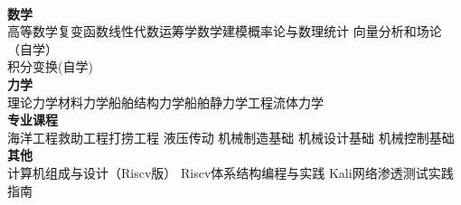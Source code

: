 \documentclass{ctexart}
\begin{document}
\begin{flushleft}
    {\linespread{1.5}\selectfont
    \hrulefill \\
    \textbf{\large 数学} \\
    高等数学\quad 复变函数\quad 线性代数\quad 运筹学\quad 数学建模\quad 概率论与数理统计 \quad 向量分析和场论（自学） \\
    积分变换(自学) \\

    \textbf{\large 力学} \\
    理论力学\quad 材料力学\quad 船舶结构力学\quad 船舶静力学\quad 工程流体力学 \\

    \textbf{\large 专业课程}  \\
    海洋工程\quad 救助工程\quad 打捞工程 \quad 液压传动 \quad 机械制造基础 \quad 机械设计基础 
    \quad 机械控制基础 \\
    \textbf{\large 其他} \\
    计算机组成与设计（Riscv版） \quad Riscv体系结构编程与实践 \quad Kali网络渗透测试实践指南
    \par}
\end{flushleft}
\end{document}
